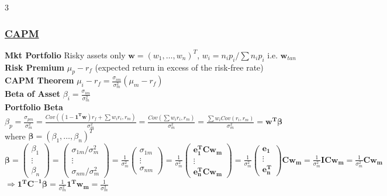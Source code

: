 \documentclass{article}
\begin{document}
{\begin{multicols*}{3}
\subsubsection*{\underline{CAPM}}
\textbf{Mkt Portfolio} Risky assets only $\boldsymbol{w}=(w_1,\dots,w_n)^T$, $w_i=n_ip_i/\sum n_ip_i$ i.e. $\boldsymbol{w}_{tan}$\\
\textbf{Risk Premium} $\mu_p-r_f$ (expected return in excess of the risk-free rate) \\
\textbf{CAPM Theorem} $\mu_i-r_f=\frac{\sigma_{im}}{\sigma_{m}^2}(\mu_{m}-r_f)$\\
\textbf{Beta of Asset} $\beta_i=\frac{\sigma_{im}}{\sigma_{m}^2}$\\
\textbf{Portfolio Beta} $\beta_p=\frac{\sigma_{pm}}{\sigma_{m}^2}=\frac{Cov((1-\boldsymbol{1^Tw})r_f+\sum w_ir_i, r_m)}{\sigma_m^2}=\frac{Cov(\sum w_ir_i, r_m)}{\sigma_m^2}=\frac{\sum w_iCov(r_i, r_m)}{\sigma_m^2}=\boldsymbol{w^T\beta}$ where $\boldsymbol{\beta}=(\beta_1,\dots,\beta_n)^T$\\
$\boldsymbol{\beta}=\begin{pmatrix}
    \beta_1\\ \vdots \\ \beta_n
\end{pmatrix}=\begin{pmatrix}
    \sigma_{1m}/\sigma_m^2\\ \vdots \\ \sigma_{nm}/\sigma_m^2
\end{pmatrix}=\frac{1}{\sigma_m^2}\begin{pmatrix}
    \sigma_{1m}\\ \vdots \\ \sigma_{nm}
\end{pmatrix}=\frac{1}{\sigma_m^2}\begin{pmatrix}
    \boldsymbol{e_1^TCw_m}\\ \vdots \\ \boldsymbol{e_n^TCw_m}
\end{pmatrix}=\frac{1}{\sigma_m^2}\begin{pmatrix}
    \boldsymbol{e_1}\\ \vdots \\ \boldsymbol{e_n^T}
\end{pmatrix}\boldsymbol{Cw_m}=\frac{1}{\sigma_m^2}\boldsymbol{ICw_m}=\frac{1}{\sigma_m^2}\boldsymbol{Cw_m}$\\
$\Longrightarrow \boldsymbol{1^TC^{-1}\beta}=\frac{1}{\sigma_m^2}\boldsymbol{1^Tw_m}=\frac{1}{\sigma_m^2}$\\

\end{multicols*}}
\end{document}
